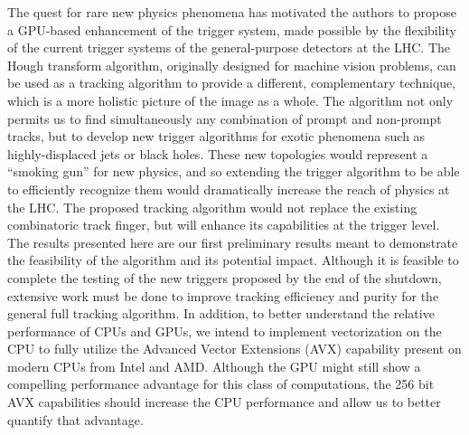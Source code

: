 \documentclass{JINST}
\begin{document}
The quest for rare new physics phenomena has motivated the authors to propose a GPU-based enhancement of the trigger
system, made possible by the flexibility of the current trigger systems of the general-purpose detectors at the LHC. The
Hough transform algorithm, originally designed for machine vision problems, can be used as a tracking algorithm to
provide a different, complementary technique, which is a more holistic picture of the image as a whole. The algorithm
not only permits us to find simultaneously any combination of prompt and non-prompt tracks, but to develop new trigger
algorithms for exotic phenomena such as highly-displaced jets or black holes. These new topologies would represent a
``smoking gun'' for new physics, and so extending the trigger algorithm to be able to efficiently recognize them would
dramatically increase the reach of physics at the LHC. The proposed tracking algorithm would not replace the existing
combinatoric track finger, but will enhance its capabilities at the trigger level. The results presented here are our
first preliminary results meant to demonstrate the feasibility of the algorithm and its potential impact. Although it is
feasible to complete the testing of the new triggers proposed by the end of the shutdown, extensive work must be done to
improve tracking efficiency and purity for the general full tracking algorithm. In addition,
to better understand the relative performance of CPUs and GPUs, we intend to implement vectorization on the CPU to fully
utilize the Advanced Vector Extensions (AVX) capability present on modern CPUs from Intel and AMD.  Although the GPU
might still show a compelling performance advantage for this class of computations, the 256 bit AVX capabilities should
increase the CPU performance and allow us to better quantify that advantage.


\end{document}
